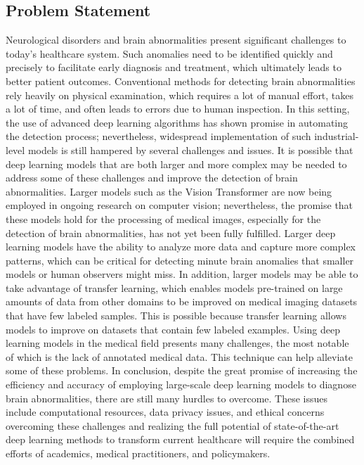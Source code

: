 \subsection{Problem Statement}
Neurological disorders and brain abnormalities present significant challenges to today's healthcare system. Such anomalies need to be identified quickly and precisely to facilitate early diagnosis and treatment, which ultimately leads to better patient outcomes. Conventional methods for detecting brain abnormalities rely heavily on physical examination, which requires a lot of manual effort, takes a lot of time, and often leads to errors due to human inspection. In this setting, the use of advanced deep learning algorithms has shown promise in automating the detection process; nevertheless, widespread implementation of such industrial-level models is still hampered by several challenges and issues. It is possible that deep learning models that are both larger and more complex may be needed to address some of these challenges and improve the detection of brain abnormalities. Larger models such as the Vision Transformer are now being employed in ongoing research on computer vision; nevertheless, the promise that these models hold for the processing of medical images, especially for the detection of brain abnormalities, has not yet been fully fulfilled. Larger deep learning models have the ability to analyze more data and capture more complex patterns, which can be critical for detecting minute brain anomalies that smaller models or human observers might miss. In addition, larger models may be able to take advantage of transfer learning, which enables models pre-trained on large amounts of data from other domains to be improved on medical imaging datasets that have few labeled samples. This is possible because transfer learning allows models to improve on datasets that contain few labeled examples. Using deep learning models in the medical field presents many challenges, the most notable of which is the lack of annotated medical data. This technique can help alleviate some of these problems. In conclusion, despite the great promise of increasing the efficiency and accuracy of employing large-scale deep learning models to diagnose brain abnormalities, there are still many hurdles to overcome. These issues include computational resources, data privacy issues, and ethical concerns overcoming these challenges and realizing the full potential of state-of-the-art deep learning methods to transform current healthcare will require the combined efforts of academics, medical practitioners, and policymakers.
